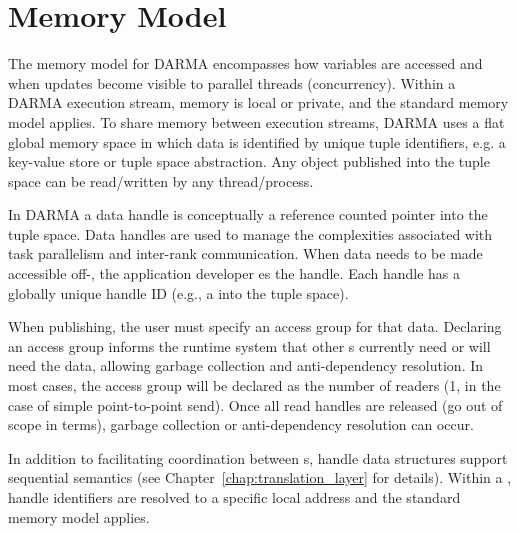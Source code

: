 
\section{Memory Model}
\label{sec:mem_model}
The memory model for \gls{DARMA} encompasses how variables are accessed %
  and when updates become visible to parallel threads (concurrency).  
Within a \gls{DARMA} execution stream, memory is local or private, and the
standard \CC{} memory model applies. 
To share memory between execution streams, \gls{DARMA} uses a flat global memory space in
which data is identified by unique \gls{tuple} identifiers, e.g. a \gls{key-value
  store} or \gls{tuple space} abstraction.  
Any object published into the \gls{tuple space} can be read/written by any thread/process. 

In \gls{DARMA} a data \gls{handle} is conceptually a \gls{reference counted pointer} into the
\gls{tuple space}.  
Data \glspl{handle} are used to manage the
complexities associated with \gls{task parallelism} and inter-\gls{rank} communication.  
When data needs to be made accessible off-, the application developer 
es the \gls{handle}.  Each \gls{handle} has a globally unique handle ID
(e.g., a  into the \gls{tuple space}).  

When publishing, the user must specify an \gls{access group} for that data.  
Declaring an \gls{access group} informs the \gls{runtime system} that other
s currently need or will need the data,  
allowing garbage collection and \gls{anti-dependency} resolution.
In most cases, the \gls{access group} will be declared as the number of readers (1, in the case of simple point-to-point send).
Once all read \glspl{handle} are released (go out of scope in \CC{} terms),
\gls{garbage collection} or \gls{anti-dependency} resolution can occur.

In addition to facilitating coordination between s, \gls{handle} data structures 
support \gls{sequential semantics} (see Chapter~\ref{chap:translation_layer} for details).
Within a , \gls{handle} identifiers are resolved to a
specific local address and the standard \CC{} memory model applies.


